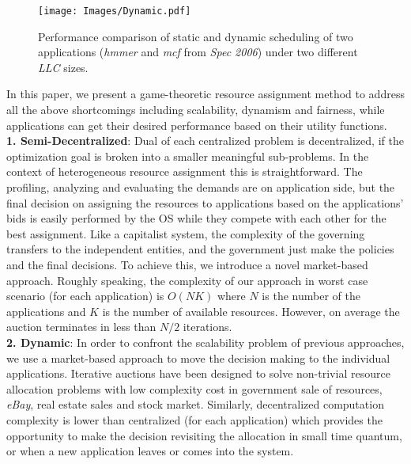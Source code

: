 \begin{figure}[!b]
\vspace{-1.5\baselineskip}
\centering
\texttt{[image: Images/Dynamic.pdf]} %
\vspace{-2\baselineskip}
\caption{\label{fig:Dynamic} Performance comparison of static and dynamic scheduling of two applications (\textit{hmmer} and \textit{mcf} from \textit{Spec 2006}) under two different \textit{LLC} sizes.}
\end{figure}
\indent In this paper, we present a game-theoretic resource assignment method to address all the above shortcomings including scalability, dynamism and fairness, while applications can get their desired performance based on their utility functions.\\
\indent \textbf{1. Semi-Decentralized}: Dual of each centralized problem is decentralized, if the optimization goal is broken into a smaller meaningful sub-problems. In the context of heterogeneous resource assignment this is straightforward. The profiling, analyzing and evaluating the demands are on application side, but the final decision on assigning the resources to applications based on the applications' bids is easily performed by the OS while they compete with each other for the best assignment. Like a capitalist system, the complexity of the governing transfers to the independent entities, and the government just make the policies and the final decisions. To achieve this, we introduce a novel market-based approach. Roughly speaking, the complexity of our approach in worst case scenario (for each application) is $O(NK)$ where $N$ is the number of the applications and $K$ is the number of available resources. However, on average the auction terminates in less than $N/2$ iterations.\\
\indent \textbf{2. Dynamic}: In order to confront the scalability problem of previous approaches, we use a market-based approach to move the decision making to the individual applications. Iterative auctions have been designed to solve non-trivial resource allocation problems with low complexity cost in government sale of resources, \textit{eBay}, real estate sales and stock market. Similarly, decentralized computation complexity is lower than centralized (for each application) which provides the opportunity to make the decision revisiting the allocation in small time quantum, or when a new application leaves or comes into the system.\\
